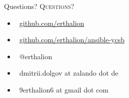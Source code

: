 \documentclass[usenames,dvipsnames, 18pt, compress, aspectratio=169]{beamer}
\def\twitter{{\FA \faTwitter}}
\def\github{{\FA \faGithub}}
\def\email{{\FA \faEnvelope}}
\begin{document}
\fontsize{18pt}{18}\selectfont
\begin{frame}
  \vspace*{2.5cm}
  \begin{minipage}[b][\paperheight]{\textwidth}
  \begin{center}

      \linespread{1.0}%
      \if@noSmallCapitals%
        Questions?
      \else%
        \scshape{\color{black} Questions?}%
      \fi%
      \vspace*{0.3em}

      \fontsize{13pt}{14}\selectfont
        \begin{itemize}[label={}]
            \item {\color{black} \github\ \href{github.com/erthalion}
                                               {\color{black}github.com/erthalion}}
            \item {\color{black} \github\ \href{github.com/erthalion/ansible-ycsb}
                                               {\color{black}github.com/erthalion/ansible-ycsb}}
            \item {\color{black} \twitter\ @erthalion}
            \item {\color{black} \email\ dmitrii.dolgov at zalando dot de}
            \item {\color{black} \email\ 9erthalion6 at gmail dot com}
        \end{itemize}
      \vspace*{2.5em}%

    \vfill
    \vspace*{2em}
  \end{center}
  \end{minipage}

\end{frame}
\end{document}
